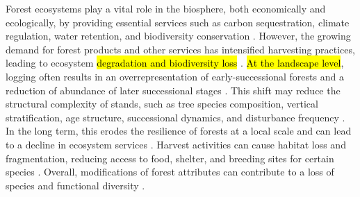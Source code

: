 
Forest ecosystems play a vital role in the biosphere, both economically and ecologically, by providing essential services such as carbon sequestration, climate regulation, water retention, and biodiversity conservation \citep{Balvanera2006Quantifyingevidence,Diaz2006BiodiversityLoss,Canadell2008Managingforests,Pawson2013Plantationforests}. 
However, the growing demand for forest products and other services has intensified harvesting practices, leading to ecosystem \hl{degradation and biodiversity loss} \citep{Bengtsson2000Biodiversitydisturbances,Sala2000Globalbiodiversity,Foley2005GlobalConsequences,Naeem2012functionsbiological}. 
\hl{At the landscape level}, logging often results in an overrepresentation of early-successional forests and a reduction of abundance of later successional stages \citep{Cyr2009Forestmanagement,Boucher2017Cumulativepatterns}. 
This shift may reduce the structural complexity of stands, such as tree species composition, vertical stratification, age structure, successional dynamics, and disturbance frequency \citep{Bergeron2000Speciesstand,Commarmot2005Structurevirgin,Varga2005Treesizediversity}. 
In the long term, this erodes the resilience of forests at a local scale and can lead to a decline in ecosystem services \citep{Hooper2012globalsynthesis,Edwards2014Maintainingecosystem}. 
Harvest activities can cause habitat loss and fragmentation, reducing access to food, shelter, and breeding sites for certain species \citep{Bouderbala2023Longtermeffect}. 
Overall, modifications of forest attributes can contribute to a loss of species and functional diversity \citep{Saccheri1998Inbreedingextinction}. 


